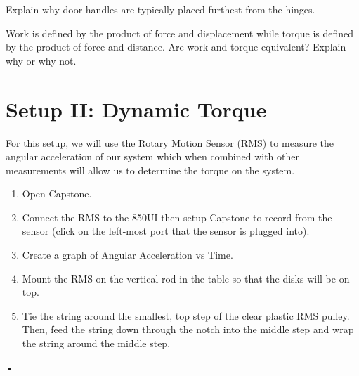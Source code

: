 \documentclass[main.tex]{subfiles}
\begin{document}
\begin{question}
Explain why door handles are typically placed furthest from the hinges.
\end{question}

\begin{question}
Work is defined by the product of force and displacement while torque is defined by the product of force and distance. Are work and torque equivalent? Explain why or why not.
\end{question}

\section{Setup II: Dynamic Torque}
For this setup, we will use the Rotary Motion Sensor (RMS) to measure the angular acceleration of our system which when combined with other measurements will allow us to determine the torque on the system.
\begin{enumerate}
\item
Open Capstone.
\item
Connect the RMS to the 850UI then setup Capstone to record from the sensor (click on the left-most port that the sensor is plugged into).
\item
Create a graph of Angular Acceleration vs Time.
\item
Mount the RMS on the vertical rod in the table so that the disks will be on top.
\item 
Tie the string around the smallest, top step of the clear plastic RMS pulley. Then, feed the string down through the notch into the middle step and wrap the string around the middle step.
\end{enumerate}•
\end{document}
